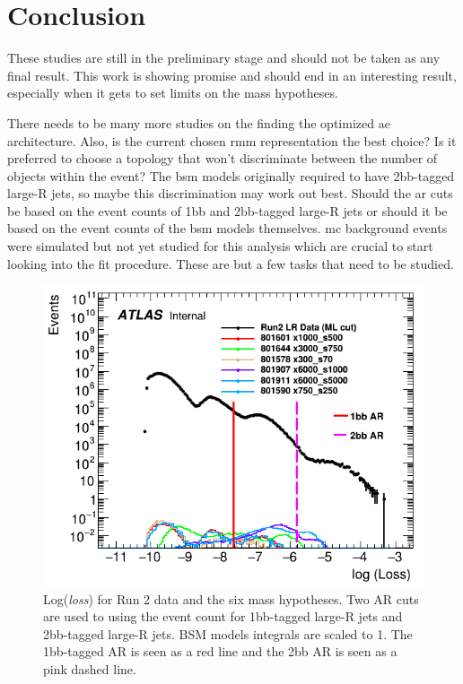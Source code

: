 \newpage



\section{Conclusion}

These studies are still in the preliminary stage and should not be taken as any final result. This work is showing promise and should end in an interesting result, especially 
when it gets to set limits on the mass hypotheses. 
\par
There needs to be many more studies on the finding the optimized \gls{ae} architecture. Also, is the current chosen \gls{rmm} representation the best choice? Is it preferred 
to choose a topology that won't discriminate between the number of objects within the event? The \gls{bsm} models originally required to have 2bb-tagged large-R jets, so maybe 
this discrimination may work out best. Should the \gls{ar} cuts be based on the event counts of 1bb and 2bb-tagged large-R jets or should it be based on the event counts of the 
\gls{bsm} models themselves. \gls{mc} background events were simulated but not yet studied for this analysis which are crucial to start looking into the fit procedure. 
These are but a few tasks that need to be studied. 
\newpage
\begin{figure}[ht]
    \centering
    \includegraphics[scale=0.6]{figs/ch7/loss_data1percent_BSM.png}%
    \caption{Log(\textit{loss}) for Run 2 data and the six mass hypotheses. Two AR cuts are used to using the event count for 1bb-tagged large-R jets and 2bb-tagged large-R 
    jets. BSM models integrals are scaled to 1. The 1bb-tagged AR is seen as a red line and the 2bb AR is seen as a pink dashed line.}
\label{fig:sh4b-bsm-data-}
\end{figure}